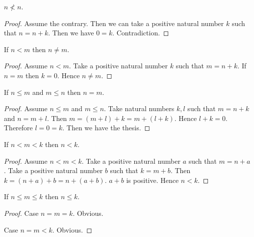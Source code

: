 \documentclass[../../arithmetic.ftl.tex]{subfiles}
\begin{document}
  \begin{forthel}
    \begin{proposition}\label{Arithmetic_02_01_659871}
      $n \nless n$.
    \end{proposition}
    \begin{proof}
      Assume the contrary.
      Then we can take a positive natural number $k$ such that $n = n + k$.
      Then we have $0 = k$.
      Contradiction.
    \end{proof}


    \begin{proposition}\label{Arithmetic_02_01_679789}
      If $n < m$ then $n \neq m$.
    \end{proposition}
    \begin{proof}
      Assume $n < m$.
      Take a positive natural number $k$ such that $m = n + k$.
      If $n = m$ then $k = 0$.
      Hence $n \neq m$.
    \end{proof}


    \begin{proposition}\label{Arithmetic_02_01_710123}
      If $n \leq m$ and $m \leq n$ then $n = m$.
    \end{proposition}
    \begin{proof}
      Assume $n \leq m$ and $m \leq n$.
      Take natural numbers $k,l$ such that $m = n + k$ and $n = m + l$.
      Then $m = (m + l) + k = m + (l + k)$.
      Hence $l + k = 0$.
      Therefore $l = 0 = k$.
      Then we have the thesis.
    \end{proof}


    \begin{proposition}\label{Arithmetic_02_01_662806}
      If $n < m < k$ then $n < k$.
    \end{proposition}
    \begin{proof}
      Assume $n < m < k$.
      Take a positive natural number $a$ such that $m = n + a$.
      Take a positive natural number $b$ such that $k = m + b$.
      Then $k = (n + a) + b = n + (a + b)$.
      $a + b$ is positive.
      Hence $n < k$.
    \end{proof}


    \begin{proposition}\label{Arithmetic_02_01_394529}
      If $n \leq m \leq k$ then $n \leq k$.
    \end{proposition}
    \begin{proof}
      Case $n = m = k$. Obvious.

      Case $n = m < k$. Obvious.


\end{proof}
\end{forthel}
\end{document}
